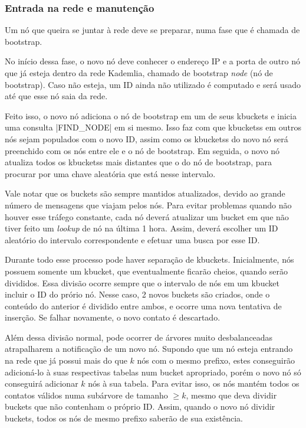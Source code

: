 
\subsubsection*{Entrada na rede e manutenção}

Um nó que queira se juntar à rede deve se preparar, numa fase que é chamada de
\gls{bootstrap}.

No início dessa fase, o novo nó deve conhecer o endereço IP e a porta de outro nó que
já esteja dentro da rede Kademlia, chamado de \gls*{bootstrap} \emph{node} (nó de
\gls*{bootstrap}). Caso não esteja, um ID ainda não utilizado é computado e será usado
até que esse nó saia da rede.

Feito isso, o novo nó adiciona o nó de \gls*{bootstrap} em um de seus \glspl*{kbucket}
e inicia uma consulta \bverb|FIND_NODE| em si mesmo. Isso faz com que \glspl*{kbuckets}
em outros nós sejam populados com o novo ID, assim como os \glspl*{kbuckets} do novo nó
será preenchido com os nós entre ele e o nó de \gls*{bootstrap}. Em seguida, o novo
nó atualiza todos os \glspl*{kbuckets} mais distantes que o do nó de \gls*{bootstrap},
para procurar por uma chave aleatória que está nesse intervalo.

Vale notar que os \glspl*{bucket} são sempre mantidos atualizados, devido ao grande
número de mensagens que viajam pelos nós. Para evitar problemas quando não houver esse
tráfego constante, cada nó deverá atualizar um \gls*{bucket} em que não tiver feito um
\emph{lookup} de nó na última 1 hora. Assim, deverá escolher um ID aleatório do
intervalo correspondente e efetuar uma busca por esse ID.

Durante todo esse processo pode haver separação de \glspl*{kbucket}. Inicialmente, nós
possuem somente um \gls*{kbucket}, que eventualmente ficarão cheios, quando serão
divididos. Essa divisão ocorre sempre que o intervalo de nós em um \gls*{kbucket}
incluir o ID do prório nó. Nesse caso, 2 novos \glspl*{bucket} são criados, onde o
conteúdo do anterior é dividido entre ambos, e ocorre uma nova tentativa de inserção. Se
falhar novamente, o novo contato é descartado.

Além dessa divisão normal, pode ocorrer de árvores muito desbalanceadas atrapalharem a
notificação de um novo nó. Supondo que um nó esteja entrando na rede que já possui mais
do que $k$ nós com o mesmo prefixo, estes conseguirão adicioná-lo à suas respectivas
tabelas num \gls*{bucket} apropriado, porém o novo nó só conseguirá adicionar $k$ nós à
sua tabela. Para evitar isso, os nós mantém todos os contatos válidos numa subárvore de
tamanho $\geq k$, mesmo que deva dividir \glspl*{bucket} que não contenham o próprio
ID. Assim, quando o novo nó dividir \glspl*{bucket}, todos os nós de mesmo prefixo
saberão de sua existência.
